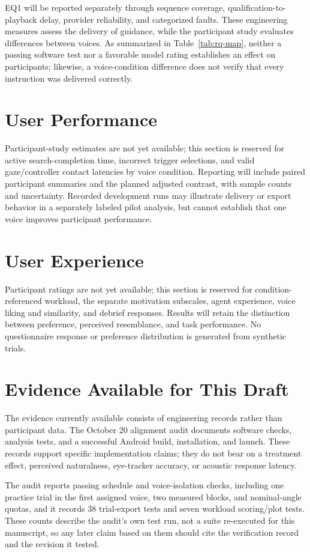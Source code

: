 EQ1 will be reported separately through sequence coverage, qualification-to-playback delay, provider reliability, and categorized faults. These engineering measures assess the delivery of guidance, while the participant study evaluates differences between voices. As summarized in Table~\ref{tab:rq-map}, neither a passing software test nor a favorable model rating establishes an effect on participants; likewise, a voice-condition difference does not verify that every instruction was delivered correctly.

\section{User Performance}
Participant-study estimates are not yet available; this section is reserved for active search-completion time, incorrect trigger selections, and valid gaze/controller contact latencies by voice condition. Reporting will include paired participant summaries and the planned adjusted contrast, with sample counts and uncertainty. Recorded development runs may illustrate delivery or export behavior in a separately labeled pilot analysis, but cannot establish that one voice improves participant performance.

\section{User Experience}
Participant ratings are not yet available; this section is reserved for condition-referenced workload, the separate motivation subscales, agent experience, voice liking and similarity, and debrief responses. Results will retain the distinction between preference, perceived resemblance, and task performance. No questionnaire response or preference distribution is generated from synthetic trials.

\section{Evidence Available for This Draft}
The evidence currently available consists of engineering records rather than participant data. The October 20 alignment audit documents software checks, analysis tests, and a successful Android build, installation, and launch. These records support specific implementation claims; they do not bear on a treatment effect, perceived naturalness, eye-tracker accuracy, or acoustic response latency.

The audit reports passing schedule and voice-isolation checks, including one practice trial in the first assigned voice, two measured blocks, and nominal-angle quotas, and it records 38 trial-export tests and seven workload scoring/plot tests. These counts describe the audit's own test run, not a suite re-executed for this manuscript, so any later claim based on them should cite the verification record and the revision it tested.

